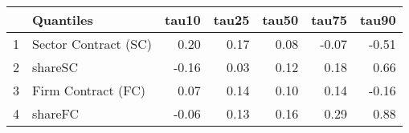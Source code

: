 \begin{table}[ht]
\centering
\begin{tabular}{rlrrrrr}
  \hline
 & Quantiles & tau10 & tau25 & tau50 & tau75 & tau90 \\ 
  \hline
1 & Sector Contract (SC) & 0.20 & 0.17 & 0.08 & -0.07 & -0.51 \\ 
  2 & shareSC & -0.16 & 0.03 & 0.12 & 0.18 & 0.66 \\ 
  3 & Firm Contract (FC) & 0.07 & 0.14 & 0.10 & 0.14 & -0.16 \\ 
  4 & shareFC & -0.06 & 0.13 & 0.16 & 0.29 & 0.88 \\ 
   \hline
\end{tabular}
\end{table}
